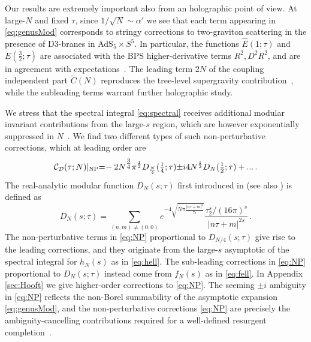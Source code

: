 \documentclass[aps,prl,twocolumn, longbibliography,footinbib,superscriptaddress, preprintnumbers]{revtex4-1}
\newcommand{\<}{\langle}
\renewcommand{\>}{\rangle}
\begin{document}
Our results are extremely important also from an holographic point of view. At large-$N$ and fixed $\tau$, since $1/\sqrt{N} \sim \alpha'$ we see that each term appearing in \eqref{eq:genusMod} corresponds to stringy corrections to two-graviton scattering in the presence of D3-branes in AdS$_5 \times S^5$. In particular, the functions $\hat{E}(1;\tau)$ and ${E}(\tfrac{3}{2};\tau)$ are associated with the BPS higher-derivative terms $R^2, D^2R^2$, and are in agreement with expectations~\cite{Bachas:1999um, Basu:2008gt, Lin:2015ixa}.  The leading term $2N$ of the coupling independent part $\widetilde{{C}}(N)$  reproduces the tree-level supergravity contribution~\cite{Chen:2025yxg}, while the subleading terms warrant further holographic study.

We stress that the spectral integral \eqref{eq:spectral} receives additional modular invariant contributions from the large-$s$ region, which are however exponentially suppressed in $N$~\cite{Dorigoni:2024dhy}. We find two different types of such non-perturbative corrections, which at leading order are
\begin{equation}\label{eq:NP}
\mathcal{C}_\mathcal{D}(\tau;N)\vert_{\rm NP} {=}\! -2 N^{\tfrac{3}{4}} \pi^{\frac{1}{2}} D_{\frac{N}{4}}(\tfrac{1}{4};\tau) {\pm }i 4 N^{\frac{1}{2}}  D_N(\tfrac{1}{2};\tau)+...\,.
\end{equation}
The real-analytic modular function $D_N(s;\tau)$ first introduced in \cite{Dorigoni:2022cua} (see also \cite{Luo:2022tqy}) is defined as
\begin{equation}\label{eq:DN}
D_N(s;\tau) = \!\! \! \sum_{(n,m)\neq (0,0)} \!\!\!  e^{-4\sqrt{N \pi \frac{|n\tau+m|^2}{\tau_2}}} \frac{\tau_2^s/(16\pi)^s}{ |n\tau+m|^{2s}}\,.
\end{equation}
The non-perturbative terms in \eqref{eq:NP} proportional to $D_{N/4}(s;\tau)$ give rise to the leading corrections, and they originate from the large-$s$ asymptotic of the spectral integral for $h_N(s)$ as in \eqref{eq:hell}. The sub-leading corrections in \eqref{eq:NP} proportional to $D_{N}(s;\tau)$ instead come from $f_N(s)$ as in \eqref{eq:fell}.
In Appendix \ref{sec:Hooft} we give higher-order corrections to \eqref{eq:NP}. The seeming $\pm i$ ambiguity in \eqref{eq:NP} reflects the non-Borel summability of the asymptotic expansion \eqref{eq:genusMod}, and the non-perturbative corrections \eqref{eq:NP} are precisely the ambiguity-cancelling contributions required for a well-defined resurgent completion~\cite{Dorigoni:2024dhy}.
\end{document}

